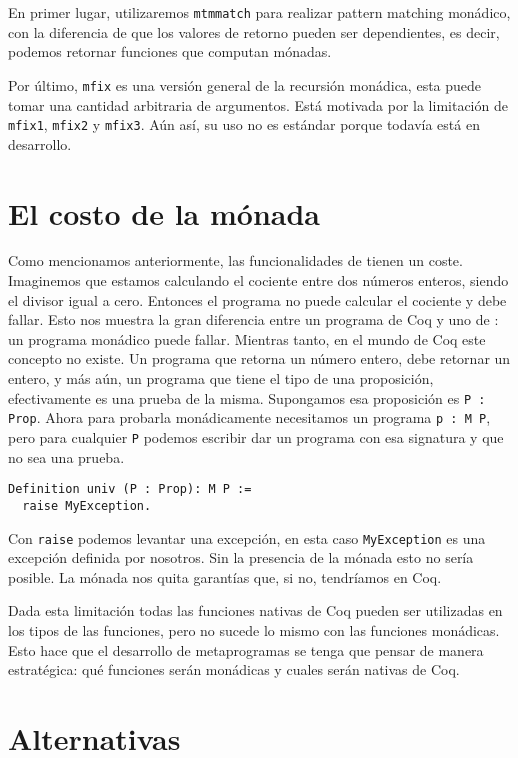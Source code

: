 En primer lugar, utilizaremos \lstinline{mtmmatch} para realizar pattern matching monádico, con la diferencia de que los valores de retorno pueden ser dependientes, es decir, podemos retornar funciones que computan mónadas.

Por último, \lstinline{mfix} es una versión general de la recursión monádica, esta puede tomar una cantidad arbitraria de argumentos. Está motivada por la limitación de \lstinline{mfix1}, \lstinline{mfix2} y \lstinline{mfix3}.
Aún así, su uso no es estándar porque todavía está en desarrollo.

\section{El costo de la mónada}

Como mencionamos anteriormente, las funcionalidades de \Mtac tienen un coste.
Imaginemos que estamos calculando el cociente entre dos números enteros, siendo el divisor igual a cero.
Entonces el programa no puede calcular el cociente y debe fallar.
Esto nos muestra la gran diferencia entre un programa de Coq y uno de \mtac: un programa monádico puede fallar.
Mientras tanto, en el mundo de Coq este concepto no existe.
Un programa que retorna un número entero, debe retornar un entero, y más aún, un programa que tiene el tipo de una proposición, efectivamente es una prueba de la misma.
Supongamos esa proposición es \lstinline{P : Prop}.
Ahora para probarla monádicamente necesitamos un programa \lstinline{p : M P}, pero para cualquier \lstinline{P} podemos escribir dar un programa con esa signatura y que no sea una prueba.

\begin{lstlisting}
Definition univ (P : Prop): M P :=
  raise MyException.
\end{lstlisting}

Con \lstinline{raise} podemos levantar una excepción, en esta caso \lstinline{MyException} es una excepción definida por nosotros.
Sin la presencia de la mónada esto no sería posible.
La mónada nos quita garantías que, si no, tendríamos en Coq.

Dada esta limitación todas las funciones nativas de Coq pueden ser utilizadas en los tipos de las funciones, pero no sucede lo mismo con las funciones monádicas.
Esto hace que el desarrollo de metaprogramas se tenga que pensar de manera estratégica: qué funciones serán monádicas y cuales serán nativas de Coq.

\section{Alternativas}

